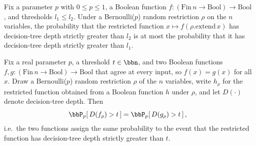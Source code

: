 \begin{lemma}
\label{LMN.bernoulliRestrProb_dtDepth_mono}
\leanok
{}
Fix a parameter $p$ with $0 \le p \le 1$, a Boolean function $f : (\mathrm{Fin}\,n \to
\mathrm{Bool}) \to \mathrm{Bool}$, and thresholds $l_1 \le l_2$. Under a Bernoulli($p$)
random restriction $\rho$ on the $n$ variables, the probability that the restricted
function $x \mapsto f(\rho.\mathrm{extend}\,x)$ has decision-tree depth strictly greater
than $l_2$ is at most the probability that it has decision-tree depth strictly greater
than $l_1$.
\end{lemma}

\begin{lemma}
\label{LMN.bernoulliRestrProb_congr_fn'}
\leanok
{}
Fix a real parameter $p$, a threshold $t \in \bbn$, and two Boolean functions $f, g :
(\mathrm{Fin}\,n \to \mathrm{Bool}) \to \mathrm{Bool}$ that agree at every input, so
$f(x) = g(x)$ for all $x$. Draw a Bernoulli($p$) random restriction $\rho$ of the $n$
variables, write $h_\rho$ for the restricted function obtained from a Boolean function
$h$ under $\rho$, and let $D(\cdot)$ denote decision-tree depth. Then
\[
  \bbP_p\!\left[\,D(f_\rho) > t\,\right] = \bbP_p\!\left[\,D(g_\rho) > t\,\right],
\]
i.e.\ the two functions assign the same probability to the event that the restricted
function has decision-tree depth strictly greater than $t$.
\end{lemma}

